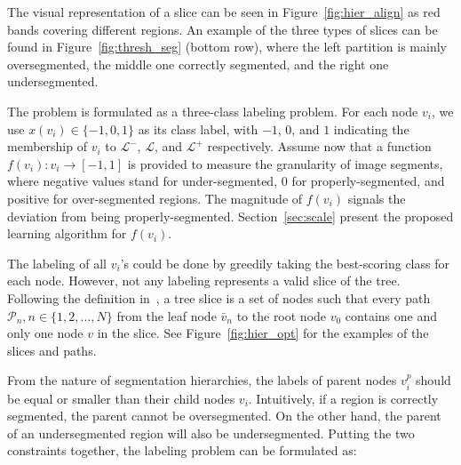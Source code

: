 The visual representation of a slice can be seen in Figure~\ref{fig:hier_align}
as red bands covering different regions.
An example of the three types of slices can be found in Figure~\ref{fig:thresh_seg} (bottom row),
where the left partition is mainly oversegmented, the middle one correctly segmented, and the right one undersegmented.

The problem is formulated as a three-class labeling problem.
For each node $v_i$, we use $x(v_i) \in\{-1,0,1\}$ as its class label, with $-1$,
$0$, and $1$ indicating the membership of $v_i$ to $\mathcal{L}^-$, 
$\mathcal{L}$, and $\mathcal{L}^+$ respectively.  Assume now that a
function $f(v_i): v_i \rightarrow [-1, 1] $ is provided to measure the
granularity of image segments, where negative values stand for
under-segmented, $0$ for properly-segmented, and positive for
over-segmented regions.
The magnitude of $f(v_i)$ signals the deviation from being properly-segmented.
Section~\ref{sec:scale} present the proposed learning algorithm for $f(v_i)$.  

The labeling of all $v_i$'s could be done by greedily taking the best-scoring class for each node.
However, not any labeling represents a valid slice of the tree.
Following the definition
in~\cite{pont2012supervised,xu2013flattening}, a tree slice is a set
of nodes such that every path $\mathcal{P}_n, n\in \{1,2, ..., N\}$
from the leaf node $\bar{v}_n$ to the root node $v_0$ contains one and
only one node $v$ in the slice. See Figure~\ref{fig:hier_opt} for the
examples of the slices and paths.

From the nature of segmentation hierarchies, the labels of parent nodes $v^p_i$
should be equal or smaller than their child nodes $v_i$.
Intuitively, if a region is correctly segmented, the parent cannot be oversegmented. On the other hand, the parent of an undersegmented region will also be undersegmented.
Putting the two constraints together, the labeling problem can be
formulated as:


